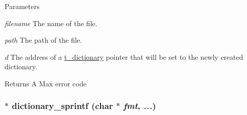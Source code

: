 \begin{DoxyParams}{Parameters}
\item[{\em filename}]The name of the file. \item[{\em path}]The path of the file. \item[{\em d}]The address of a \hyperlink{structt__dictionary}{t\_\-dictionary} pointer that will be set to the newly created dictionary. \end{DoxyParams}
\begin{DoxyReturn}{Returns}
A Max error code 
\end{DoxyReturn}
\hypertarget{group__dictionary_ga77d5bafc260f9fc0bf3b4ad35f2b2629}{
\subsubsection[{dictionary\_\-sprintf}]{$\ast$ dictionary\_\-sprintf (char $\ast$ {\em fmt}, \/   {\em ...})}}
\label{group__dictionary_ga77d5bafc260f9fc0bf3b4ad35f2b2629}


